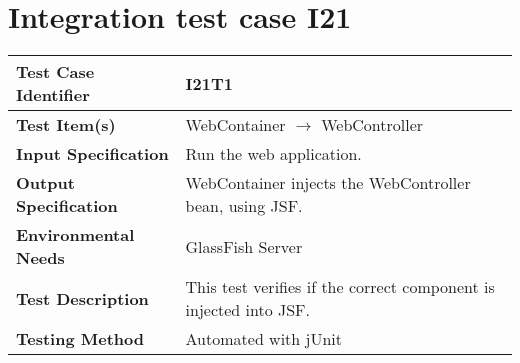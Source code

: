 \vspace{2em}

\section{Integration test case I21}

\begin{tabular}{l p{}}
    \hline
    \textbf{Test Case Identifier} & I21T1\\
    \hline
    \textbf{Test Item(s)} & WebContainer $\rightarrow$ WebController \\
    \hline
    \textbf{Input Specification} & Run the web application.\\
    \hline
    \textbf{Output Specification} & WebContainer injects the WebController bean, using JSF.\\
    \hline
    \textbf{Environmental Needs} & GlassFish Server\\
    \hline
    \textbf{Test Description} & This test verifies if the correct component is injected into JSF.\\
    \hline
    \textbf{Testing Method} & Automated with jUnit \\
    \hline
\end{tabular}

